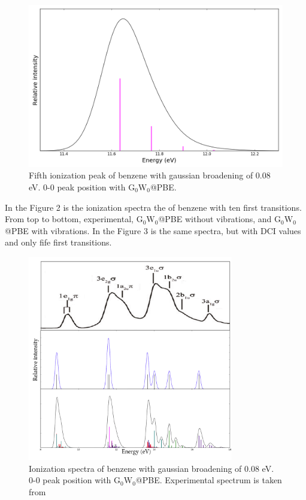 \documentclass{article}
\begin{document}
\begin{figure}[h!]
    \centering
    \includegraphics[width=\textwidth]{4th_peak.png}
    \caption{Fifth ionization peak of benzene with gaussian broadening of 0.08 eV. 0-0 peak position with $\text{G}_0\text{W}_0$@PBE.}
\end{figure}


In the Figure 2 is the ionization spectra the of benzene with ten first transitions. From top to bottom, experimental, $\text{G}_0\text{W}_0$@PBE without vibrations, and $\text{G}_0\text{W}_0$@PBE with vibrations. In the Figure 3 is the same spectra, but with DCI values and only fife first transitions.

\begin{figure}[h!]
    \centering
    \includegraphics[width=0.8\textwidth]{GW_experiment.png}
    \caption{Ionization spectra of benzene with gaussian broadening of 0.08 eV. 0-0 peak position with $\text{G}_0\text{W}_0$@PBE. Experimental spectrum is taken from \cite{liu2011}}
\end{figure}
\end{document}
